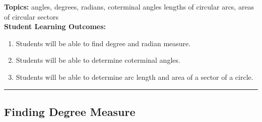 

\noindent \textbf{Topics:}  angles, degrees, radians, coterminal angles lengths of circular arcs, areas of circular sectors\\

\noindent \textbf{Student Learning Outcomes:}
\begin{enumerate}
\item Students will be able to find degree and radian measure.
\item Students will be able to determine coterminal angles.
\item Students will be able to determine arc length and area of a sector of a circle.
\end{enumerate}

\hrule 

\bigskip

\subsection{Finding Degree Measure} ~

\noindent
{}


